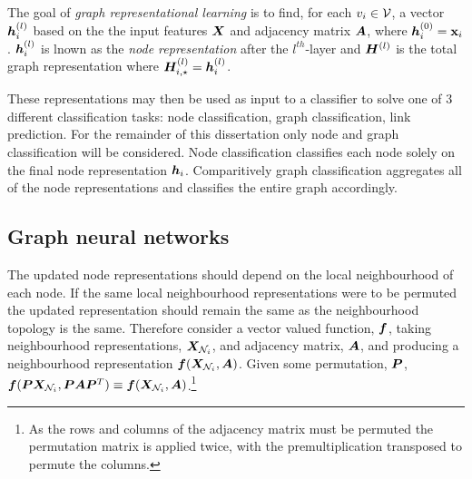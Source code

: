 
The goal of \emph{graph representational learning} is to find, for each $v_i \in {\mathcal{V}}$, a vector ${\bm{h}}_i^{(l)}$ based on the the input features ${\bm{X}}$ and adjacency matrix ${\bm{A}}$, where ${\bm{h}}_i^{(0)} = {\textbf{x}}_i$.
${\bm{h}}_i^{(l)}$ is lnown as the \emph{node representation} after the $l^{th}$-layer and ${\bm{H}}^{(l)}$ is the total graph representation where ${\bm{H}}_{i, \star}^{(l)} = {\bm{h}}_i^{(l)}$.



These representations may then be used as input to a classifier to solve one of 3 different classification tasks: node classification, graph classification, link prediction.
For the remainder of this dissertation only node and graph classification will be considered.
Node classification classifies each node solely on the final node representation ${\bm{h}}_i$.
Comparitively graph classification aggregates all of the node representations and classifies the entire graph accordingly.

\subsection{Graph neural networks}



The updated node representations should depend on the local neighbourhood of each node.
If the same local neighbourhood representations were to be permuted the updated representation should remain the same as the neighbourhood topology is the same.
Therefore consider a vector valued function, ${\bm{f}}$, taking neighbourhood representations, ${\bm{X}}_{{\mathcal{N}}_i}$, and adjacency matrix, ${\bm{A}}$, and producing a neighbourhood representation ${\bm{f}}({\bm{X}}_{{\mathcal{N}}_i}, {\bm{A}})$.
Given some permutation, ${\bm{P}}$, ${\bm{f}}({\bm{P}}{\bm{X}}_{{\mathcal{N}}_i}, {\bm{P}}{\bm{A}}{\bm{P}}^T) \equiv {\bm{f}}({\bm{X}}_{{\mathcal{N}}_i}, {\bm{A}})$.\footnote{As the rows and columns of the adjacency matrix must be permuted the permutation matrix is applied twice, with the premultiplication transposed to permute the columns.}

